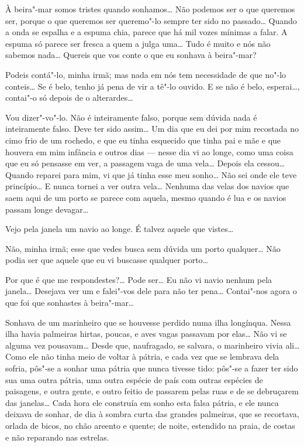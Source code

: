  À beira"-mar somos tristes
quando sonhamos\ldots{} Não podemos ser
o que queremos ser, porque o que queremos		\EP[]
ser queremo"-lo sempre ter
sido no passado\ldots{} Quando a onda se
espalha e a espuma chia, parece que
há mil vozes mínimas a falar. A espuma
só parece ser fresca a quem a
julga uma\ldots{} Tudo é muito e nós 
não sabemos nada\ldots{} Quereis que vos
conte o que eu sonhava à beira"-mar?

 Podeis contá"-lo, minha irmã; mas nada em nós tem
necessidade de que no"-lo conteis\ldots{}
Se é belo, tenho já pena de vir a
tê"-lo ouvido. E se não é belo, esperai\ldots{},
contai"-o só depois de o
alterardes\ldots{}

 Vou dizer"-vo"-lo. Não é 
inteiramente falso, porque sem
dúvida nada é inteiramente falso. Deve ter
sido assim\ldots{} Um dia que eu
dei por mim recostada no cimo frio de um rochedo, 
e que eu tinha esquecido que tinha pai e mãe e
que houvera em mim infância e outros
dias --- nesse dia vi ao longe, como uma coisa que 
eu só pensasse em ver,
a passagem vaga de uma vela\ldots{} Depois ela
cessou\ldots{} Quando reparei para
mim, vi que já tinha esse meu sonho\ldots{} Não sei onde ele teve
princípio\ldots{} E nunca tornei a ver outra
vela\ldots{} Nenhuma das velas dos
navios que saem aqui de um porto se parece com
aquela, mesmo quando é lua e os navios passam longe devagar\ldots{}

 Vejo pela janela um navio ao longe.
É talvez aquele que vistes\ldots{}

 Não, minha irmã; esse que
vedes busca sem dúvida um porto
qualquer\ldots{} Não podia ser que
aquele que eu vi buscasse qualquer porto\ldots{}

 Por que é que me respondestes?\ldots{} 
Pode ser\ldots{} Eu não vi navio
nenhum pela janela\ldots{} Desejava ver um
e falei"-vos dele para não ter
pena\ldots{} Contai"-nos agora o que foi
que sonhastes à beira"-mar\ldots{} 

 Sonhava de um marinheiro
que se houvesse perdido numa ilha
longínqua. Nessa ilha havia palmeiras hirtas, poucas, e aves vagas
passavam por elas\ldots{} Não vi se alguma
vez pousavam\ldots{} Desde que,
naufragado, se salvara, o marinheiro vivia
ali\ldots{} Como ele não tinha
meio de voltar à pátria, e cada vez que se lembrava dela sofria,
pôs"-se a sonhar uma pátria que nunca tivesse
tido: pôs"-se a fazer
ter sido sua uma outra pátria, uma outra espécie de país com outras
espécies de paisagens, e outra gente, e outro
feitio de passarem pelas
ruas e de se debruçarem das janelas\ldots{}
Cada hora ele construía em sonho
esta falsa pátria, e ele nunca deixava de sonhar,
de dia à sombra curta
das grandes palmeiras, que se recortava, orlada de bicos, no chão
areento e quente; de noite, estendido na praia, de costas e não
reparando nas estrelas.

